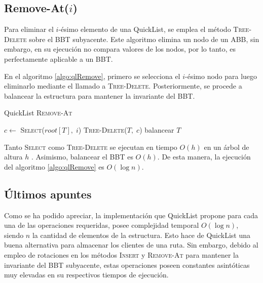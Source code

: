 \documentclass[a4paper,10pt,twocolumn]{article}
\newcommand{\la}{\leftarrow}
\begin{document}
\subsection{Remove-At($ i $)}\label{subsec:qlRemove}
  Para eliminar el $ i $-ésimo elemento de una QuickList, se emplea el método
  \textsc{Tree-Delete} \cite[pág. 262]{MIT2} sobre el BBT subyacente. Este algoritmo elimina
  un nodo de un ABB, sin embargo, en su ejecución no compara valores de los nodos, por lo 
  tanto, es perfectamente aplicable a un BBT.
  
  En el algoritmo \ref{algo:qlRemove}, primero se selecciona el $ i $-ésimo nodo para luego
  eliminarlo mediante el llamado a \textsc{Tree-Delete}. Posteriormente, se procede a
  balancear la estructura para mantener la invariante del BBT.
  
  \begin{algorithm}[htb]\label{algo:qlRemove}
  	\caption{QuickList \textsc{Remove-At}}
  	
  	\SetAlgoLined
  	
  	
  	\LinesNumbered
  	\SetAlgoVlined
  	
  	$ c \la $ \textsc{Select}($ root[T],\; i $)\;
  	\textsc{Tree-Delete}($ T,\; c $)\;
  	balancear $ T $\;
  	
  \end{algorithm}

  Tanto \textsc{Select} como \textsc{Tree-Delete} se ejecutan en tiempo $ O(h) $ en un árbol
  de altura $ h $ \cite[pág. 263]{MIT2}. Asimismo, balancear el BBT es $ O(h) $. De esta 
  manera, la ejecución del algoritmo \ref{algo:qlRemove} es $ O(\log n) $.

\subsection{Últimos apuntes}\label{subsec:qlSummary}
  Como se ha podido apreciar, la implementación que QuickList propone para cada una de las
  operaciones requeridas, posee complejidad temporal $ O(\log n) $, siendo $ n $ la cantidad
  de elementos de la estructura. Esto hace de QuickList una buena alternativa para almacenar
  los clientes de una ruta. Sin embargo, debido al empleo de rotaciones en los métodos
  \textsc{Insert} y \textsc{Remove-At} para mantener la invariante del BBT subyacente, estas
  operaciones poseen constantes asintóticas muy elevadas en su respectivos tiempos de 
  ejecución.
  
\end{document}
